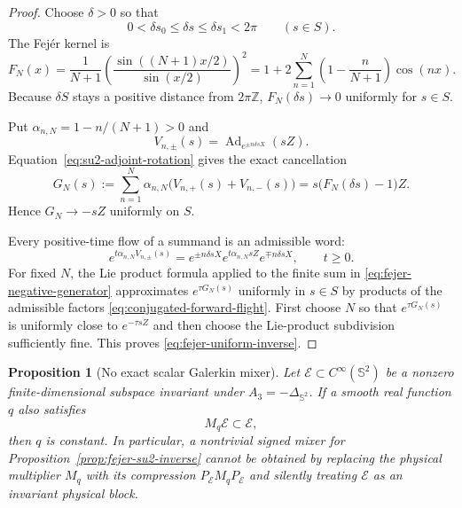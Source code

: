 \documentclass[11pt]{article}
\newtheorem{proposition}[theorem]{Proposition}
\theoremstyle{remark}
\begin{document}
\begin{proof}
Choose $\delta>0$ so that
\[
 0<\delta s_0\leq\delta s\leq\delta s_1<2\pi
 \qquad(s\in S).
\]
The Fej\'er kernel is
\begin{equation}
 F_N(x)=
 \frac1{N+1}
 \left(\frac{\sin((N+1)x/2)}{\sin(x/2)}\right)^2
 =
 1+2\sum_{n=1}^N
 \left(1-\frac n{N+1}\right)\cos(nx).
 \label{eq:fejer-positive-cosine}
\end{equation}
Because $\delta S$ stays a positive distance from $2\pi\mathbb Z$,
$F_N(\delta s)\to0$ uniformly for $s\in S$.

Put $\alpha_{n,N}=1-n/(N+1)>0$ and
\[
 V_{n,\pm}(s)
 =
 \operatorname{Ad}_{e^{\pm n\delta sX}}(sZ).
\]
Equation~\eqref{eq:su2-adjoint-rotation} gives the exact cancellation
\begin{equation}
 G_N(s):=
 \sum_{n=1}^N\alpha_{n,N}
 \bigl(V_{n,+}(s)+V_{n,-}(s)\bigr)
 =
 s\bigl(F_N(\delta s)-1\bigr)Z.
 \label{eq:fejer-negative-generator}
\end{equation}
Hence $G_N\to-sZ$ uniformly on $S$.

Every positive-time flow of a summand is an admissible word:
\begin{equation}
 e^{t\alpha_{n,N}V_{n,\pm}(s)}
 =
 e^{\pm n\delta sX}
 e^{t\alpha_{n,N}sZ}
 e^{\mp n\delta sX},
 \qquad t\geq0.
 \label{eq:conjugated-forward-flight}
\end{equation}
For fixed $N$, the Lie product formula applied to the finite sum in
\eqref{eq:fejer-negative-generator} approximates $e^{\tau G_N(s)}$
uniformly in $s\in S$ by products of the admissible factors
\eqref{eq:conjugated-forward-flight}.  First choose $N$ so that
$e^{\tau G_N(s)}$ is uniformly close to $e^{-\tau sZ}$ and then choose the
Lie-product subdivision sufficiently fine.  This proves
\eqref{eq:fejer-uniform-inverse}.
\end{proof}

\begin{proposition}[No exact scalar Galerkin mixer]
\label{prop:no-exact-scalar-galerkin-mixer}
Let $\mathcal E\subset C^\infty(\mathbb S^2)$ be a nonzero finite-dimensional
subspace invariant under $A_3=-\Delta_{\mathbb S^2}$.  If a smooth real
function $q$ also satisfies
\begin{equation}
 M_q\mathcal E\subset\mathcal E,
 \label{eq:exact-multiplier-invariance}
\end{equation}
then $q$ is constant.  In particular, a nontrivial signed mixer for
Proposition~\ref{prop:fejer-su2-inverse} cannot be obtained by replacing the
physical multiplier $M_q$ with its compression
$P_{\mathcal E}M_qP_{\mathcal E}$ and silently treating $\mathcal E$ as an
invariant physical block.
\end{proposition}
\end{document}
